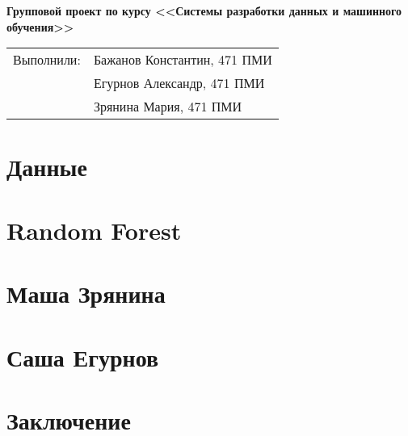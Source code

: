 \documentclass[12pt,a4paper]{article}
\begin{document}
\begin{center}
    \Large \bf Групповой проект по курсу <<Системы разработки данных и машинного обучения>>
\end{center}

\begin{flushleft}
    \begin{tabular}[H]{ll}
        Выполнили: & Бажанов Константин, 471 ПМИ\\
        &Егурнов Александр, 471 ПМИ\\
        &Зрянина Мария, 471 ПМИ\\
    \end{tabular}
\end{flushleft}

\section{Данные}

\section{Random Forest}

\section{Маша Зрянина}

\section{Саша Егурнов}

\section{Заключение}



\end{document}
